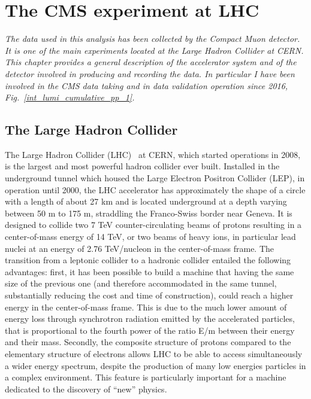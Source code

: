\chapter{The CMS experiment at LHC}
\label{cap2}
\textit{The data used in this analysis has been collected by the Compact Muon detector. It is one of the main experiments located at the Large Hadron Collider at CERN. This chapter provides a general description of the accelerator system and of  the detector   involved in producing and
recording the data. In particular I have been involved in the CMS data taking and in data validation operation since 2016, Fig.~\ref{int_lumi_cumulative_pp_1}.}

\section{The Large Hadron Collider}
The Large Hadron Collider (LHC)~\cite{Pettersson:291782}  at CERN,
which started operations in 2008, is the largest and most powerful hadron collider ever built. Installed in the
underground tunnel which housed the Large Electron Positron Collider (LEP),
in operation until 2000, the LHC accelerator
has approximately the shape of a circle with a length of about 27 km
and is located underground at a depth varying
between 50 m to 175 m, straddling the Franco-Swiss border near Geneva. It is designed
to collide two 7 TeV counter-circulating beams of protons resulting in a center-of-mass
energy of 14 TeV, or two beams of heavy ions, in particular lead nuclei at an energy of
2.76 TeV/nucleon in the center-of-mass frame.
The transition from a leptonic collider to a hadronic collider entailed the following
advantages: first, it has been possible to build a machine that having the same size of the
previous one (and therefore accommodated in the same tunnel,
substantially reducing the cost and time of construction), could reach
a higher energy in the center-of-mass
frame. This is due to the much lower amount of energy loss through synchrotron radiation
emitted by the accelerated particles, that is proportional to the fourth power of the ratio
E/m between their energy and their mass. Secondly, the composite structure of protons
compared to the elementary structure of electrons allows LHC to be able to access simultaneously a wider energy spectrum, despite the production of many low energies particles in a complex environment. This feature is particularly important for a machine dedicated
to the discovery of “new” physics.


